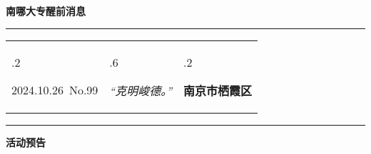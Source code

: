 \documentclass[letterpaper, 12pt]{article}
\begin{document}
\begin{center}
    \Huge\textbf{南哪大专醒前消息}
\end{center}
\vspace{4mm}
\hrule
\renewcommand\tabularxcolumn[1]{m{#1}}
\begin{tabularx}{\textwidth}{>{\hsize.2\hsize}X>{\hsize.6\hsize}X>{\hsize.2\hsize}X}
    \begin{flushleft}
        2024.10.26\, No.99
    \end{flushleft}
    &
    \begin{center}
        \textit{“克明峻德。”}
    \end{center}
    &
    \begin{flushright}
        \textbf{南京市栖霞区}
    \end{flushright}
\end{tabularx}
\vspace{-3.5mm}
\hrule
\vspace{4mm}
\centerline{\huge\textbf{活动预告}}
\end{document}
